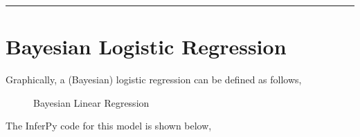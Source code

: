 \documentclass[letterpaper,10pt,english]{sphinxmanual}
\begin{document}
\begin{sphinxVerbatim}[commandchars=\\\{\}]
     



\PYG{p}{[} \PYG{p}{]}


\end{sphinxVerbatim}


\bigskip\hrule\bigskip



\section{Bayesian Logistic Regression}
\label{\detokenize{notes/probzoo:bayesian-logistic-regression}}
Graphically, a (Bayesian) logistic regression can be defined as follows,

\begin{figure}[htbp]
\centering
\capstart

\noindent{}
\caption{Bayesian Linear Regression}\label{\detokenize{notes/probzoo:id2}}\end{figure}

The InferPy code for this model is shown below,
\end{document}
